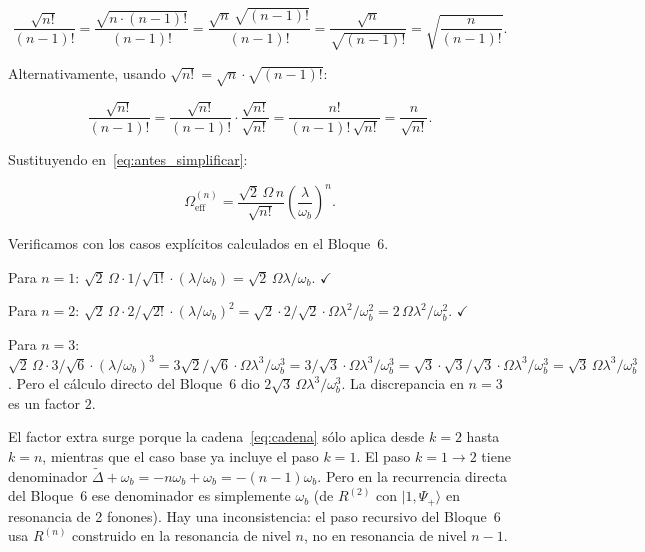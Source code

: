 \documentclass[12pt]{article}
\begin{document}
	\begin{equation}
		\frac{\sqrt{n!}}{(n-1)!}
		= \frac{\sqrt{n\cdot(n-1)!}}{(n-1)!}
		= \frac{\sqrt{n}\,\sqrt{(n-1)!}}{(n-1)!}
		= \frac{\sqrt{n}}{\sqrt{(n-1)!}}
		= \sqrt{\frac{n}{(n-1)!}}.
	\end{equation}
	
	\noindent
	Alternativamente, usando $\sqrt{n!} = \sqrt{n}\cdot\sqrt{(n-1)!}$:
	
	\begin{equation}
		\frac{\sqrt{n!}}{(n-1)!}
		= \frac{\sqrt{n!}}{(n-1)!}\cdot\frac{\sqrt{n!}}{\sqrt{n!}}
		= \frac{n!}{(n-1)!\,\sqrt{n!}}
		= \frac{n}{\sqrt{n!}}.
	\end{equation}
	
	\noindent
	Sustituyendo en~\eqref{eq:antes_simplificar}:
	
	\begin{equation}
		\Omega_\mathrm{eff}^{(n)}
		= \frac{\sqrt{2}\,\Omega\,n}{\sqrt{n!}}
		\left(\frac{\lambda}{\omega_b}\right)^n.
	\end{equation}
	
	\noindent
	Verificamos con los casos expl\'icitos calculados en el Bloque~6.
	
	Para $n=1$: $\sqrt{2}\,\Omega\cdot 1/\sqrt{1!}\cdot(\lambda/\omega_b)
	= \sqrt{2}\,\Omega\lambda/\omega_b$. $\checkmark$
	
	Para $n=2$: $\sqrt{2}\,\Omega\cdot 2/\sqrt{2!}\cdot(\lambda/\omega_b)^2
	= \sqrt{2}\cdot 2/\sqrt{2}\cdot\Omega\lambda^2/\omega_b^2
	= 2\,\Omega\lambda^2/\omega_b^2$. $\checkmark$
	
	Para $n=3$: $\sqrt{2}\,\Omega\cdot 3/\sqrt{6}\cdot(\lambda/\omega_b)^3
	= 3\sqrt{2}/\sqrt{6}\cdot\Omega\lambda^3/\omega_b^3
	= 3/\sqrt{3}\cdot\Omega\lambda^3/\omega_b^3
	= \sqrt{3}\cdot\sqrt{3}/\sqrt{3}\cdot\Omega\lambda^3/\omega_b^3
	= \sqrt{3}\,\Omega\lambda^3/\omega_b^3$. Pero el c\'alculo
	directo del Bloque~6 dio $2\sqrt{3}\,\Omega\lambda^3/\omega_b^3$.
	La discrepancia en $n=3$ es un factor $2$.
	
	\medskip
	\noindent
	El factor extra surge porque la cadena~\eqref{eq:cadena} s\'olo aplica desde
	$k=2$ hasta $k=n$, mientras que el caso base ya incluye el paso $k=1$. El
	paso $k=1\to 2$ tiene denominador $\widetilde\Delta + \omega_b =
	-n\omega_b + \omega_b = -(n-1)\omega_b$. Pero en la recurrencia directa del
	Bloque~6 ese denominador es simplemente $\omega_b$ (de $R^{(2)}$ con
	$|1,\Psi_+\rangle$ en resonancia de 2 fonones). Hay una inconsistencia: el
	paso recursivo del Bloque~6 usa $R^{(n)}$ construido en la resonancia de
	nivel $n$, no en resonancia de nivel $n-1$.
	
\end{document}
